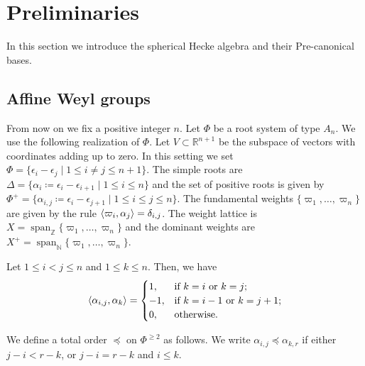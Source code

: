\section{Preliminaries}  \label{sec: prelimnares}
In this section we introduce the spherical Hecke algebra and their Pre-canonical bases. 


\subsection{Affine Weyl groups}

From now on we fix a positive integer $n$.
Let $\Phi$ be a root system of type $A_n$. 
We use the following realization of $\Phi$. 
Let $V\subset \mathbb{R}^{n+1}$ be the subspace of vectors with coordinates adding up to zero. 
In this setting we set $\Phi=\{ \epsilon_i -\epsilon_j \mid 1\leq i\neq j \leq n+1\}$. 
The simple roots are $\Delta = \{ \alpha_i\coloneqq \epsilon_i-\epsilon_{i+1} \mid 1\leq i \leq n \}$ and the set of positive roots is given by $\Phi^+=\{   \alpha_{i,j} \coloneqq  \epsilon_i -\epsilon_{j+1} \mid 1\leq i\leq j \leq n  \}$. 
The fundamental weights $\{\varpi_1 , \ldots , \varpi_n\}$ are given by the rule $\langle \varpi_i , \alpha_j \rangle = \delta_{i,j}$. 
The weight lattice is $X=\operatorname{span}_{\mathbb{Z}} \{\varpi_1 , \ldots , \varpi_n\}$ and the dominant weights are $X^+=\operatorname{span}_{\mathbb{N}} \{\varpi_1 , \ldots , \varpi_n\}$.



\begin{remark}\rm \label{remark producto interno}
  Let $1\leq i < j \leq n$ and $1\leq k \leq n$. Then, we have
  \begin{equation}
      \langle \alpha_{i,j} , \alpha_k \rangle = \begin{cases}
          1, & \mbox{if } k=i \mbox{ or } k=j;\\
          -1, & \mbox{if } k=i-1 \mbox{ or } k=j+1; \\
          0, & \mbox{otherwise.}
       \end{cases}
  \end{equation}
\end{remark}


\begin{definition}\rm 
  We  define a total order $\preceq $ on  $\Phi^{\geq 2}$ as follows. 
  We write $\alpha_{i,j}\preceq \alpha_{k,r}$ if either $j-i < r-k$,  or $j-i = r-k$ and $i\leq k$.   
\end{definition}

